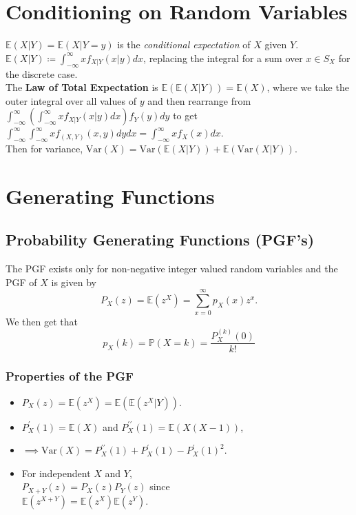 \documentclass[titlepage,twocolumn]{article}
\begin{document}
\section*{Conditioning on Random Variables}
$\mathbb{E}(X|Y) = \mathbb{E}(X|Y=y)$ is the \textit{conditional expectation} of $X$ given $Y$.\\[2mm]
$\mathbb{E}(X|Y) \coloneqq \int_{-\infty}^{\infty}x f_{X|Y}(x|y)dx$, replacing the integral for a sum over $x \in S_X$ for the discrete case.\\[2mm]
The \textbf{Law of Total Expectation} is $\mathbb{E}(\mathbb{E}(X|Y)) = \mathbb{E}(X)$, where we take the outer integral over all values of $y$ and then rearrange from $\int_{-\infty}^{\infty}(\int_{-\infty}^{\infty} x f_{X|Y}(x|y) dx) f_Y(y) dy$ to get $\int_{-\infty}^{\infty}\int_{-\infty}^{\infty} x f_{(X,Y)}(x,y) dy dx = \int_{-\infty}^{\infty} x f_X(x) dx$.\\[2mm]
Then for variance, $\mbox{Var}(X) = \mbox{Var}(\mathbb{E}(X|Y)) + \mathbb{E}(\mbox{Var}(X|Y))$.

\section*{Generating Functions}
\subsection*{Probability Generating Functions (PGF's)}
The PGF exists only for non-negative integer valued random variables and the PGF of $X$ is given by $$P_X(z) = \mathbb{E}(z^X) = \sum_{x=0}^{\infty}p_X(x)z^x.$$ We then get that $$p_X(k) = \mathbb{P}(X=k) = \frac{P_X^{(k)}(0)}{k!}$$
\subsubsection*{Properties of the PGF}
\begin{itemize}
    \item $P_X(z) = \mathbb{E}(z^X) = \mathbb{E}(\mathbb{E}(z^X|Y))$.
    \item $P_X^\prime(1) = \mathbb{E}(X)$ and $P_X^{\prime\prime}(1) = \mathbb{E}(X(X-1))$,
    \item $\implies \mbox{Var}(X) = P_X^{\prime\prime}(1) + P_X^{\prime}(1) - P_X^{\prime}(1)^2$.
    \item For independent $X$ and $Y$,\\$P_{X+Y}(z)=P_X(z)P_Y(z)$ since\\$\mathbb{E}(z^{X+Y}) = \mathbb{E}(z^X)\mathbb{E}(z^Y)$.
\end{itemize}
\end{document}
